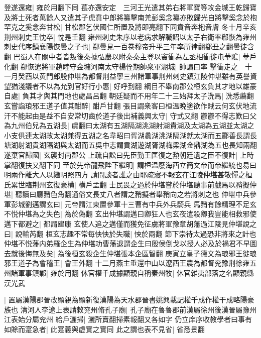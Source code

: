 登遂還雍|{
	雍於用翻下同}
萇亦還安定　三河王光遣其弟右將軍寶等攻金城王乾歸寶及將士死者萬餘人又遣其子虎賁中郎將纂擊南羌彭奚念纂亦敗歸光自將擊奚念於枹罕克之奚念奔甘松|{
	甘松郡乞伏國仁所置及將即亮翻下同賁音奔枹音膚}
冬十月辛亥荆州刺史王忱卒|{
	忱是壬翻}
雍州刺史朱序以老病求解職詔以太子右衛率郗恢為雍州刺史代序鎮襄陽恢曇之子也|{
	郗曇見一百卷穆帝升平三年率所律翻郗丑之翻曇徒含翻}
巴蜀人在關中者皆叛後秦據弘農以附秦秦主登以竇衝為左丞相衝徙屯華隂|{
	華戶化翻}
郗恢遣將軍趙睦守金墉河南太守楊佺期帥衆軍湖城|{
	帥讀曰率}
擊衝走之　十一月癸酉以黄門郎殷仲堪為都督荆益寧三州諸軍事荆州刺史鎮江陵仲堪雖有英譽資望猶淺議者不以為允到官好行小惠|{
	好呼到翻}
綱目不舉南郡公桓玄負其才地以雄豪自處|{
	負其才與其門地也處昌呂翻}
朝廷疑而不用年二十三始拜太子洗馬|{
	洗悉薦翻}
玄嘗詣琅邪王道子值其酣醉|{
	酣戶甘翻}
張目謂衆客曰桓温晩塗欲作賊云何玄伏地流汗不能起由是益不自安常切齒於道子後出補義興太守|{
	守式又翻}
鬱鬱不得志歎曰父為九州伯兒為五湖長|{
	虞翻曰太湖有五湖隔湖洮湖射湖貴湖及太湖為五湖並太湖之小支俱連太湖故太湖兼得五湖之名韋昭曰胥湖蠡湖洮湖隔湖就太湖而五酈善長謂長塘湖射湖貴湖隔湖與太湖而五吳中志謂貢湖遊湖胥湖梅梁湖金鼎湖為五也長知兩翻}
遂棄官歸國|{
	玄襲封南郡公}
上疏自訟曰先臣勤王匡復之勲朝廷遺之臣不復計|{
	上時掌翻復扶又翻下同}
至於先帝龍飛陛下繼明|{
	謂桓温廢海西立簡文帝而帝繼統也易曰明兩作離大人以繼明照四方}
請問談者誰之由耶疏寢不報玄在江陵仲堪甚敬憚之桓氏累世臨荆州玄復豪横|{
	横戶孟翻}
士民畏之過於仲堪嘗於仲堪聽事前戲馬以矟擬仲堪|{
	聽讀曰廳矟色角翻通俗文長丈八者謂之矟擬者舉矟向之若將刺之也}
仲堪中兵參軍彭城劉邁謂玄曰|{
	元帝謂江東置參軍十三曹有中兵外兵騎兵}
馬矟有餘精理不足玄不悦仲堪為之失色|{
	為於偽翻}
玄出仲堪謂邁曰卿狂人也玄夜遣殺卿我豈能相救邪使邁下都避之|{
	都謂建康}
玄使人追之邁僅而獲免征虜將軍豫章胡藩過江陵見仲堪說之曰|{
	說輸芮翻}
桓玄志趣不常每怏怏於失職|{
	怏於兩翻}
節下崇待太過恐非將來之計也仲堪不悦藩内弟羅企生為仲堪功曹藩退謂企生曰殷侯倒戈以授人必及於禍君不早圖去就後悔無及矣|{
	為後桓玄殺企生仲堪張本企區智翻}
庚寅立皇子德文為琅邪王徙琅邪王道子為會稽王|{
	會王外翻}
十二月燕主垂還中山以遼西王農為都督兖豫荆徐雍五州諸軍事鎮鄴|{
	雍於用翻}
休官權千成據顯親自稱秦州牧|{
	休官雜夷部落之名顯親縣漢光武}


|{
	置屬漢陽郡晉改顯親為顯新復漢陽為天水郡晉書姚興載記權千成作權干成略陽豪族也}
清河人李遼上表請敕兖州脩孔子廟|{
	孔子廟在魯魯郡前漢屬徐州後漢晉屬豫州江表始分屬兖州}
給戶灑掃|{
	灑所賣翻掃素報翻又各如字}
仍立庠序收教學者曰事有如賖而寔急者|{
	此寔義與虚實之實同}
此之謂也表不見省|{
	省悉景翻}


